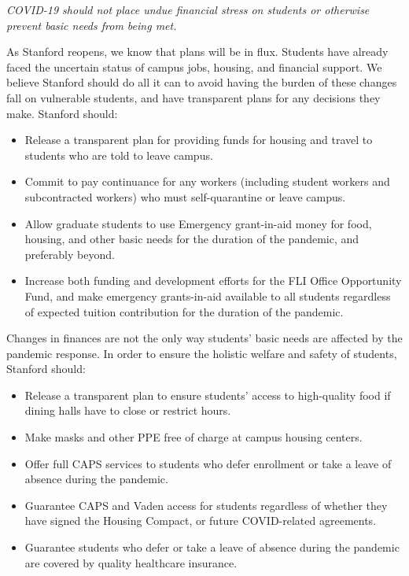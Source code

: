 \documentclass[12pt, titlepage, letterpaper]{article}
\begin{document}
\textit{COVID-19 should not place undue financial stress on students or otherwise prevent basic needs from being met.}

As Stanford reopens, we know that plans will be in flux. Students have already faced the  uncertain status of campus jobs, housing, and financial support. We believe Stanford should do all it can to avoid having the burden of these changes fall on vulnerable students, and have transparent plans for any decisions they make. Stanford should:

\begin{itemize}
    \item Release a transparent plan for providing funds for housing and travel to students who are told to leave campus.
    \newline
    \item Commit to pay continuance for any workers (including student workers and subcontracted workers) who must self-quarantine or leave campus.
    \item Allow graduate students to use Emergency grant-in-aid money for food, housing, and other basic needs for the duration of the pandemic, and preferably beyond.
    \item Increase both funding and development efforts for the FLI Office Opportunity Fund, and make emergency grants-in-aid available to all students regardless of expected tuition contribution for the duration of the pandemic.
\end{itemize}

Changes in finances are not the only way students’ basic needs are affected by the pandemic response. In order to ensure the holistic welfare and safety of students, Stanford should: 

\begin{itemize}
    \item Release a transparent plan to ensure students’ access to high-quality food if dining halls have to close or restrict hours.
    \item Make masks and other PPE free of charge at campus housing centers.
    \item Offer full CAPS services to students who defer enrollment or take a leave of absence during the pandemic.
    \item Guarantee CAPS and Vaden access for students regardless of whether they have signed the Housing Compact, or future COVID-related agreements.
    \item Guarantee students who defer or take a leave of absence during the pandemic are covered by quality healthcare insurance. 

\end{itemize}
\end{document}
